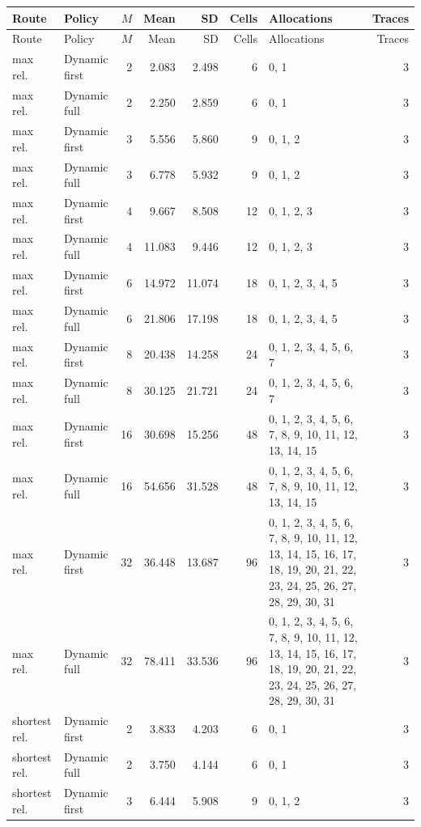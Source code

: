 \documentclass[10pt,a4paper]{article}
\begin{document}
\tiny\setlength{\tabcolsep}{2pt}\begin{longtable}{@{}p{23mm}p{29mm}rrrrp{36mm}r@{}}
\toprule Route & Policy & $M$ & Mean & SD & Cells & Allocations & Traces \\ \midrule\endfirsthead
\toprule Route & Policy & $M$ & Mean & SD & Cells & Allocations & Traces \\ \midrule\endhead
\bottomrule\endfoot
max rel. & Dynamic first & 2 & 2.083 & 2.498 & 6 & 0, 1 & 3 \\
max rel. & Dynamic full & 2 & 2.250 & 2.859 & 6 & 0, 1 & 3 \\
max rel. & Dynamic first & 3 & 5.556 & 5.860 & 9 & 0, 1, 2 & 3 \\
max rel. & Dynamic full & 3 & 6.778 & 5.932 & 9 & 0, 1, 2 & 3 \\
max rel. & Dynamic first & 4 & 9.667 & 8.508 & 12 & 0, 1, 2, 3 & 3 \\
max rel. & Dynamic full & 4 & 11.083 & 9.446 & 12 & 0, 1, 2, 3 & 3 \\
max rel. & Dynamic first & 6 & 14.972 & 11.074 & 18 & 0, 1, 2, 3, 4, 5 & 3 \\
max rel. & Dynamic full & 6 & 21.806 & 17.198 & 18 & 0, 1, 2, 3, 4, 5 & 3 \\
max rel. & Dynamic first & 8 & 20.438 & 14.258 & 24 & 0, 1, 2, 3, 4, 5, 6, 7 & 3 \\
max rel. & Dynamic full & 8 & 30.125 & 21.721 & 24 & 0, 1, 2, 3, 4, 5, 6, 7 & 3 \\
max rel. & Dynamic first & 16 & 30.698 & 15.256 & 48 & 0, 1, 2, 3, 4, 5, 6, 7, 8, 9, 10, 11, 12, 13, 14, 15 & 3 \\
max rel. & Dynamic full & 16 & 54.656 & 31.528 & 48 & 0, 1, 2, 3, 4, 5, 6, 7, 8, 9, 10, 11, 12, 13, 14, 15 & 3 \\
max rel. & Dynamic first & 32 & 36.448 & 13.687 & 96 & 0, 1, 2, 3, 4, 5, 6, 7, 8, 9, 10, 11, 12, 13, 14, 15, 16, 17, 18, 19, 20, 21, 22, 23, 24, 25, 26, 27, 28, 29, 30, 31 & 3 \\
max rel. & Dynamic full & 32 & 78.411 & 33.536 & 96 & 0, 1, 2, 3, 4, 5, 6, 7, 8, 9, 10, 11, 12, 13, 14, 15, 16, 17, 18, 19, 20, 21, 22, 23, 24, 25, 26, 27, 28, 29, 30, 31 & 3 \\
shortest rel. & Dynamic first & 2 & 3.833 & 4.203 & 6 & 0, 1 & 3 \\
shortest rel. & Dynamic full & 2 & 3.750 & 4.144 & 6 & 0, 1 & 3 \\
shortest rel. & Dynamic first & 3 & 6.444 & 5.908 & 9 & 0, 1, 2 & 3 \\

\end{longtable}
\end{document}
